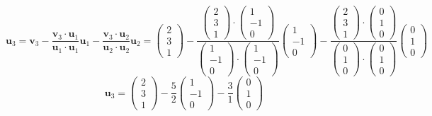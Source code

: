 \documentclass[a3paper,12pt]{extarticle} %
\begin{document}
\begin{enumerate}
\begin{enumerate}
\[            \mathbf{u}_3 = \mathbf{v}_3 - \frac{\mathbf{v}_3 \cdot \mathbf{u}_1}{\mathbf{u}_1 \cdot \mathbf{u}_1} \mathbf{u}_1 - \frac{\mathbf{v}_3 \cdot \mathbf{u}_2}{\mathbf{u}_2 \cdot \mathbf{u}_2} \mathbf{u}_2 = \begin{pmatrix} 2 \\ 3 \\ 1 \end{pmatrix} - \frac{\begin{pmatrix} 2 \\ 3 \\ 1 \end{pmatrix} \cdot \begin{pmatrix} 1 \\ -1 \\ 0 \end{pmatrix}}{\begin{pmatrix} 1 \\ -1 \\ 0 \end{pmatrix} \cdot \begin{pmatrix} 1 \\ -1 \\ 0 \end{pmatrix}} \begin{pmatrix} 1 \\ -1 \\ 0 \end{pmatrix} - \frac{\begin{pmatrix} 2 \\ 3 \\ 1 \end{pmatrix} \cdot \begin{pmatrix} 0 \\ 1 \\ 0 \end{pmatrix}}{\begin{pmatrix} 0 \\ 1 \\ 0 \end{pmatrix} \cdot \begin{pmatrix} 0 \\ 1 \\ 0 \end{pmatrix}} \begin{pmatrix} 0 \\ 1 \\ 0 \end{pmatrix}
        \]
        \[
            \mathbf{u}_3 = \begin{pmatrix} 2 \\ 3 \\ 1 \end{pmatrix} - \frac{5}{2} \begin{pmatrix} 1 \\ -1 \\ 0 \end{pmatrix} - \frac{3}{1} \begin{pmatrix} 0 \\ 1 \\ 0 \end{pmatrix}
\]
\end{enumerate}
\end{enumerate}
\end{document}
